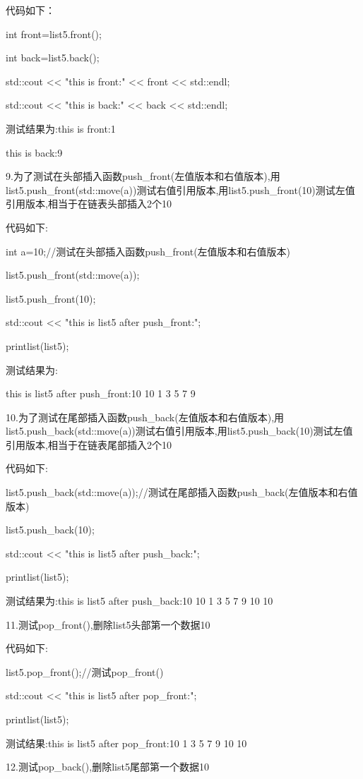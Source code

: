 \documentclass[UTF8]{ctexart}
\begin{document}
代码如下：


int front=list5.front();
    
int back=list5.back();
    
std::cout << "this is front:" << front << std::endl;
    
std::cout << "this is back:" << back << std::endl;

测试结果为:this is front:1

this is back:9

9.为了测试在头部插入函数push\_front(左值版本和右值版本),用list5.push\_front(std::move(a))测试右值引用版本,用list5.push\_front(10)测试左值引用版本,相当于在链表头部插入2个10
    
代码如下:

    int a=10;//测试在头部插入函数push\_front(左值版本和右值版本)
    
    list5.push\_front(std::move(a));
    
    list5.push\_front(10);
    
    std::cout << "this is list5 after push\_front:";
    
    printlist(list5);

    测试结果为:
   
    this is list5 after push\_front:10 10 1 3 5 7 9

10.为了测试在尾部插入函数push\_back(左值版本和右值版本),用list5.push\_back(std::move(a))测试右值引用版本,用list5.push\_back(10)测试左值引用版本,相当于在链表尾部插入2个10
    
    代码如下:

    list5.push\_back(std::move(a));//测试在尾部插入函数push\_back(左值版本和右值版本)
    
    list5.push\_back(10);
    
    std::cout << "this is list5 after push\_back:";
    
    
    printlist(list5);

    测试结果为:this is list5 after push\_back:10 10 1 3 5 7 9 10 10

11.测试pop\_front(),删除list5头部第一个数据10

代码如下:

    list5.pop\_front();//测试pop\_front()
    
    std::cout << "this is list5 after pop\_front:";
    
    printlist(list5);

测试结果:this is list5 after pop\_front:10 1 3 5 7 9 10 10

12.测试pop\_back(),删除list5尾部第一个数据10
\end{document}
